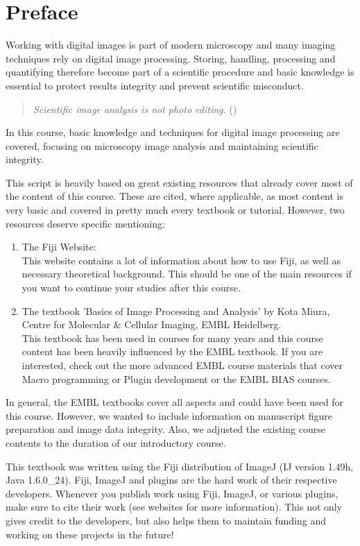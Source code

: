 \chapter*{Preface}

Working with digital images is part of modern microscopy and many imaging techniques rely on digital image processing. Storing, handling, processing and quantifying therefore become part of a scientific procedure and basic knowledge is essential to protect results integrity and prevent scientific misconduct. 

\begin{quote}
	\emph{Scientific image analysis is not photo editing.} (\cite{rossner2004})
\end{quote}

In this course, basic knowledge and techniques for digital image processing are covered, focusing on microscopy image analysis and maintaining scientific integrity. 


This script is heavily based on great existing resources that already cover most of the content of this course. These are cited, where applicable, as most content is very basic and covered in pretty much every textbook or tutorial. However, two resources deserve specific mentioning:
\begin{enumerate}
	\item The Fiji Website:\\This website contains a lot of information about how to use Fiji, as well as necessary theoretical background. This should be one of the main resources if you want to continue your studies after this course.
	\item The textbook 'Basics of Image Processing and Analysis' by Kota Miura, Centre for Molecular \& Cellular Imaging, EMBL Heidelberg.\\This textbook has been used in courses for many years and this course content has been heavily influenced by the EMBL textbook. If you are interested, check out the more advanced EMBL course materials that cover Macro programming or Plugin development or the EMBL BIAS courses.
\end{enumerate}

In general, the EMBL textbooks cover all aspects and could have been used for this course. However, we wanted to include information on manuscript figure preparation and image data integrity. Also, we adjusted the existing course contents to the duration of our introductory course.

This textbook was written using the Fiji distribution of ImageJ (IJ version 1.49h, Java 1.6.0\_24). Fiji, ImageJ and plugins are the hard work of their respective developers. Whenever you publish work using Fiji, ImageJ, or various plugins, make sure to cite their work (see websites for more information). This not only gives credit to the developers, but also helps them to maintain funding and working on these projects in the future!